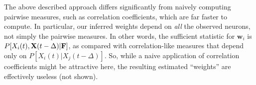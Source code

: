 \documentclass[aoas,preprint]{imsart}
\newcommand{\w}{w}
\newcommand{\bw}{\mathbf{\w}}
\newcommand{\bF}{{\bf F}}
\newcommand{\bX}{{\bf X}}
\begin{document}

The above described approach differs significantly from naively computing pairwise measures, such as correlation coefficients, which are far faster to compute.  In particular, our inferred weights depend on \emph{all} the observed neurons, not simply the pairwise measures.  In other words, the sufficient statistic for $\bw_i$ is $P[X_i(t), \bX(t-\Delta) | \bF]$, as compared with correlation-like measures that depend only on $P[X_i(t) | X_j(t-\Delta)]$.  So, while a naive application of correlation coefficients might be attractive here, the resulting estimated ``weights'' are effectively useless (not shown).  
\end{document}
